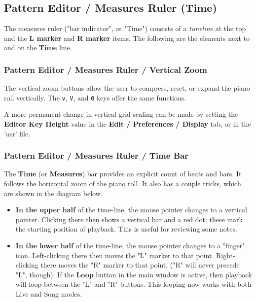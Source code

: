 \subsection{Pattern Editor / Measures Ruler (Time)}
\label{subsec:pattern_editor_measures_ruler}

   The measures ruler ("bar indicator", or "Time")
   consists of a \textsl{timeline} at the top and the 
   \textbf{L marker} and \textbf{R marker} items.
   The following are the elements next to and on
   the \textbf{Time} line.

\subsubsection{Pattern Editor / Measures Ruler / Vertical Zoom}
\label{subsubsec:pattern_editor_measures_ruler_vertical_zoom}

   The vertical zoom buttons
   allow the user to compress, reset, or expand the
   piano roll vertically.
   The \texttt{v}, \texttt{V}, and \texttt{0} keys offer
   the same functions.

   A more permanent change in vertical grid scaling
   can be made by setting the \textbf{Editor Key Height} value in
   the \textbf{Edit / Preferences / Display} tab,
   or in the 'usr' file.

\subsubsection{Pattern Editor / Measures Ruler / Time Bar}
\label{subsubsec:pattern_editor_measures_ruler_time_bar}

      The \textbf{Time} (or \textbf{Measures}) bar provides an explicit
      count of beats and bars.
      It follows the horizontal zoom of the piano roll.
      It also has a couple tricks, which are shown in the diagram below.

      \begin{itemize}
         \item \textbf{In the upper half} of the time-line,
            the mouse pointer changes to a vertical pointer.
            Clicking there then shows a vertical bar and a red dot; these mark
            the starting position of playback.
            This is useful for reviewing some notes.
         \item \textbf{In the lower half} of the time-line,
            the mouse pointer changes to a "finger" icon.
            Left-clicking there then moves the "L" marker to that point.
            Right-clicking there moves the "R" marker to that point.
            ("R" will never precede "L", though).
            If the \textbf{Loop} button in the main window is active, then
            playback will loop between the "L" and "R" buttons.
            This looping now works with both Live and Song modes.
      \end{itemize}

